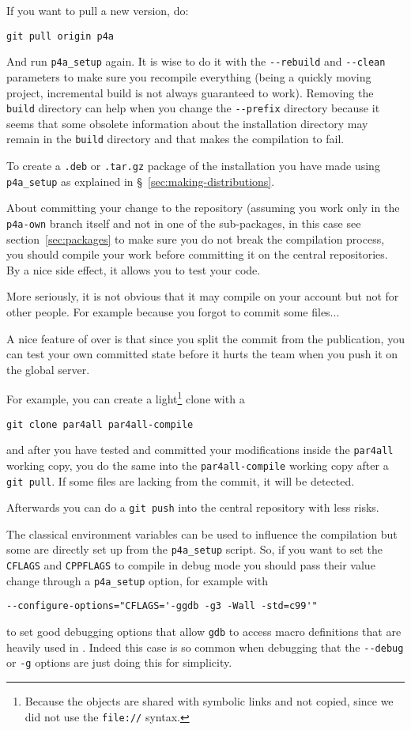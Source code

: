 \documentclass[a4paper]{article}
\begin{document}
If you want to pull a new version, do:
\begin{verbatim}
git pull origin p4a
\end{verbatim}

And run \verb|p4a_setup| again. It is wise to do it with the
\verb|--rebuild| and \verb|--clean| parameters to make sure you recompile
everything (\Apips being a quickly moving project, incremental build is
not always guaranteed to work). Removing the \texttt{build} directory can
help when you change the \verb|--prefix| directory because it seems that
some obsolete information about the installation directory may remain in
the \texttt{build} directory and that makes the compilation to fail.

To create a \texttt{.deb} or \texttt{.tar.gz} package of the installation
you have made using \verb|p4a_setup| as explained in
\S~\ref{sec:making-distributions}.

About committing your change to the \Agit repository (assuming you work
only in the \texttt{p4a-own} branch itself and not in one of the \Apfa
sub-packages, in this case see section~\ref{sec:packages} to make sure you
do not break the compilation process, you should compile your work before
committing it on the central repositories. By a nice side effect, it
allows you to test your code. \smiley

More seriously, it is not obvious that it may compile on your account but
not for other people. For example because you forgot to commit some
files...

A nice feature of \Agit over \Asvn is that since you split the commit from
the publication, you can test your own committed state before it hurts the
team when you push it on the global server.

For example, you can create a light\footnote{Because the objects are
  shared with symbolic links and not copied, since we did not use the
  \texttt{file://} syntax.} clone with a
\begin{verbatim}
git clone par4all par4all-compile
\end{verbatim}
and after you have tested and committed your modifications inside the
\texttt{par4all} working copy, you do the same into the
\texttt{par4all-compile} working copy after a \texttt{git pull}.
If some files are lacking from the commit, it will be detected.

Afterwards you can do a \texttt{git push} into the central \Apfa
repository with less risks.

The classical \Aautotools environment variables can be used to influence
the compilation but some are directly set up from the \verb|p4a_setup|
script. So, if you want to set the \texttt{CFLAGS} and \texttt{CPPFLAGS}
to compile \Apfa in debug mode you should pass their value change through
a \verb|p4a_setup| option, for example with
\begin{verbatim}
--configure-options="CFLAGS='-ggdb -g3 -Wall -std=c99'"
\end{verbatim}
to set good debugging options that allow \texttt{gdb} to access macro
definitions that are heavily used in \Apips. Indeed this case is so common
when debugging \Apfa that the \verb|--debug| or \verb|-g| options are just
doing this for simplicity.
\end{document}
